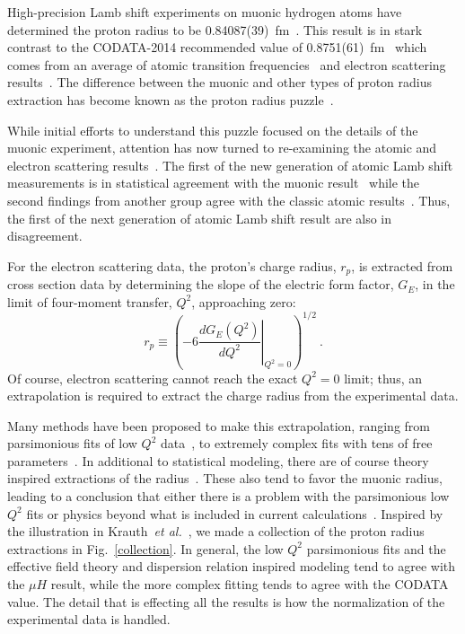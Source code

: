 \documentclass[10pt,aps,prc,twocolumn]{revtex4-1}
\begin{document}
High-precision Lamb shift experiments on muonic hydrogen atoms have determined the proton radius to 
be 0.84087(39)~fm~\cite{Pohl:2010zza,Antognini:1900ns}.   This result is in stark contrast to the
CODATA-2014 recommended value of 0.8751(61)~fm~\cite{Mohr:2015ccw} which comes from an average of atomic 
transition frequencies~\cite{Boshier:1989zz,Weitz:1994zz,Berkeland:1995dyd,Bourzeix:1996zz,Udem:1997zz} and electron scattering results~\cite{Mohr:2012tt,Arrington:2015ria}.    The difference between the muonic and other types of 
proton radius extraction has become known as the proton radius puzzle~\cite{Pohl:2013yb,Carlson:2015jba,Gao:2015aax,Pohl:2016tqq,Nez:2011zz}.

While initial efforts to understand this puzzle focused on the details of the muonic experiment, attention has
now turned to re-examining the atomic and electron scattering results~\cite{Kelkar:2016tcx}.   The first of the
new generation of atomic Lamb shift measurements is in statistical agreement with the muonic 
result~\cite{Beyer79} while the second findings from another group agree with the classic atomic 
results~\cite{fleurbaey:tel-01633631,Fleurbaey:2018}.   Thus, the first of the next generation of
atomic Lamb shift result are also in disagreement.

For the electron scattering data, the proton's charge radius, $r_p$, is extracted from
cross section data by determining the slope of the electric form factor, $G_E$, in the
limit of four-moment transfer, $Q^2$, approaching zero: 
\begin{equation}
\label{eq:radius}
  r_p \equiv %
    \left( -6  \left. \frac{dG_E(Q^2)}{dQ^2}
    \right|_{Q^{2}=0} \right)^{1/2} \>.
\end{equation}
Of course, electron scattering cannot reach the exact $Q^2 = 0$ limit; thus,
an extrapolation is required to extract the charge radius from the experimental data.

Many methods have been proposed to make this extrapolation,
ranging from parsimonious fits of low $Q^2$ data~\cite{Rosenfelder:1999cd,Griffioen:2015hta,Horbatsch:2015qda,Higinbotham:2015rja},
to extremely complex fits with tens of free parameters~\cite{Bernauer:2010wm,Bernauer:2013tpr,Lee:2015jqa,Graczyk:2014lba,Lorenz:2014vha}.
In additional to statistical modeling, there are of course 
theory inspired extractions of the radius~\cite{Belushkin:2006qa,Horbatsch:2016ilr}.   These also tend to favor the 
muonic radius, leading to a conclusion that either there is a problem with the parsimonious low $Q^2$ fits or physics beyond
what is included in current calculations~\cite{Carlson:2015jba,Liu:2016qwd}.
Inspired by the illustration in Krauth~{\it{et al.}}~\cite{Krauth:2017ijq}, we made a collection
of the proton radius extractions in Fig.~\ref{collection}.    In general, the low $Q^2$ parsimonious fits
and the effective field theory and dispersion relation inspired modeling tend to agree 
with the $\mu H$ result, while the more complex fitting
tends to agree with the CODATA value.   The detail that is effecting all the results is how the normalization
of the experimental data is handled.
\end{document}
